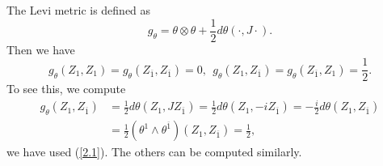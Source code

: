 \documentclass{amsart}
\theoremstyle{Corollary}
\numberwithin{equation}{section}
\begin{document}
The Levi metric is defined as 
\begin{equation}\label{Levi}
g_\theta=\theta\otimes\theta+\frac{1}{2}d\theta(\cdot,J\cdot).
\end{equation}
Then we have 
\begin{equation}\label{2.2}
g_\theta(Z_1,Z_1)=g_\theta(Z_{\overline{1}},Z_{\overline{1}})=0,~~
g_\theta(Z_1,Z_{\overline{1}})=g_\theta(Z_{\overline{1}},Z_1)=\frac{1}{2}.
\end{equation}
To see this, we compute 
\begin{equation*}
\begin{split}
g_\theta(Z_1,Z_{\overline{1}})&=\frac{1}{2}d\theta(Z_1,JZ_{\overline{1}})
=\frac{1}{2}d\theta(Z_1,-iZ_{\overline{1}})=-\frac{i}{2}d\theta(Z_1,Z_{\overline{1}})\\
&=\frac{1}{2}(\theta^1\wedge \theta^{\overline{1}})(Z_1,Z_{\overline{1}})=\frac{1}{2},
\end{split}
\end{equation*}
we have used (\ref{2.1}). The others can be computed similarly. 
\end{document}
